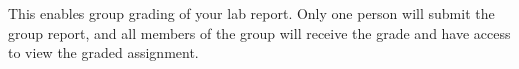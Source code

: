 This enables group grading of your lab report. Only one person will submit the group report, and all members of the group will receive the grade and have access to view the graded assignment.


%
%
%
%		
%
%	
%	
%	
%	
